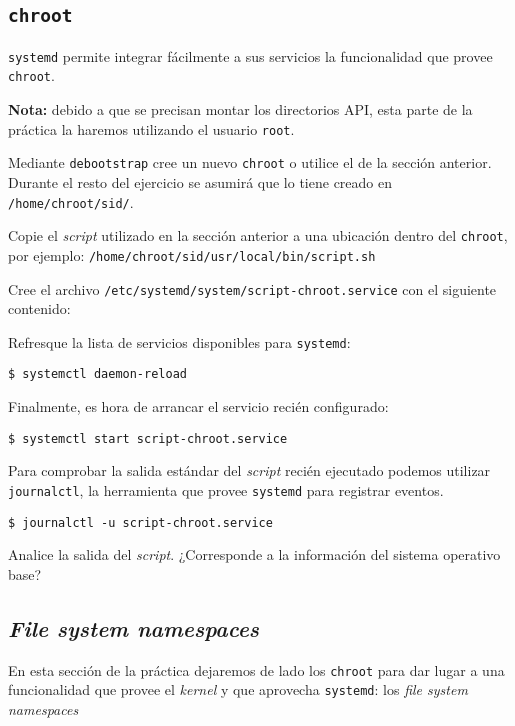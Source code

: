 \subsection{\texttt{chroot}}
\texttt{systemd} permite integrar fácilmente a sus servicios la
funcionalidad que provee \texttt{chroot}.

\textbf{Nota:} debido a que se precisan montar los directorios API, esta
parte de la práctica la haremos utilizando el usuario \texttt{root}.
\begin{questions}
  \question Mediante \texttt{debootstrap} cree un nuevo \texttt{chroot} o
  utilice el de la sección anterior. Durante el resto del ejercicio se
  asumirá que lo tiene creado en \texttt{/home/chroot/sid/}.

  \question Copie el \textit{script} utilizado en la sección anterior a una
  ubicación dentro del \texttt{chroot}, por ejemplo:
  \texttt{/home/chroot/sid/usr/local/bin/script.sh}

  \question Cree el archivo
  \texttt{/etc/systemd/system/script-chroot.service} con el siguiente
  contenido:

  

  \question Refresque la lista de servicios disponibles para
  \texttt{systemd}:
  \begin{verbatim}
$ systemctl daemon-reload
\end{verbatim}

    \question Finalmente, es hora de arrancar el servicio recién configurado:
\begin{verbatim}
$ systemctl start script-chroot.service
\end{verbatim}

    \question Para comprobar la salida estándar del \textit{script} recién
    ejecutado podemos utilizar \texttt{journalctl}, la herramienta que
    provee \texttt{systemd} para registrar eventos.
\begin{verbatim}
$ journalctl -u script-chroot.service
\end{verbatim}

    Analice la salida del \textit{script}. ¿Corresponde a la información
    del sistema operativo base?   

\end{questions}

\subsection{\textit{File system namespaces}}
En esta sección de la práctica dejaremos de lado los \texttt{chroot} para
dar lugar a una funcionalidad que provee el \textit{kernel} y que aprovecha
\texttt{systemd}: los \textit{file system namespaces}

